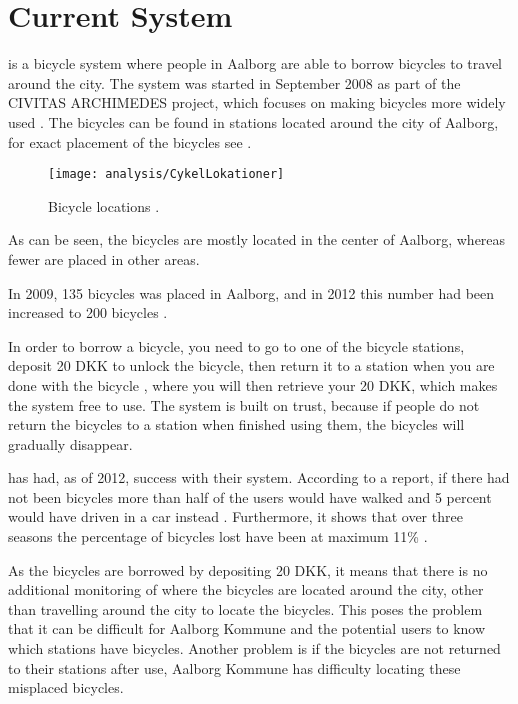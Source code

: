 \section{Current System}\label{sec:currentsystem}


\bycykel is a bicycle system where people in Aalborg are able to borrow bicycles to travel around the city.
The system was started in September 2008 as part of the CIVITAS ARCHIMEDES project, which focuses on making bicycles more widely used \citep{misc:aalborgcykling}.
The bicycles can be found in stations located around the city of Aalborg, for exact placement of the bicycles see .

\begin{figure}[h]
	\centering
	\texttt{[image: analysis/CykelLokationer]}
	\caption{Bicycle locations \citep{misc:aalborgbycykel}.}
	\label{fig:CykelLokationer}
\end{figure}

As can be seen, the bicycles are mostly located in the center of Aalborg, whereas fewer are placed in other areas.

In 2009, 135 bicycles was placed in Aalborg, and in 2012 this number had been increased to 200 bicycles \citep{misc:aalborgcykling}.

In order to borrow a bicycle, you need to go to one of the bicycle stations, deposit 20 DKK to unlock the bicycle, then return it to a station when you are done with the bicycle \citep{misc:aalborgbycykelregler}, where you will then retrieve your 20 DKK, which makes the system free to use.
The system is built on trust, because if people do not return the bicycles to a station when finished using them, the bicycles will gradually disappear.

\bycykel has had, as of 2012, success with their system. 
According to a report, if there had not been bicycles more than half of the users would have walked and 5 percent would have driven in a car instead \citep{misc:aalborgcykling}.
Furthermore, it shows that over three seasons the percentage of bicycles lost have been at maximum 11\% \citep{misc:aalborgcykling}.

As the bicycles are borrowed by depositing 20 DKK, it means that there is no additional monitoring of where the bicycles are located around the city, other than travelling around the city to locate the bicycles.
This poses the problem that it can be difficult for Aalborg Kommune and the potential users to know which stations have bicycles.
Another problem is if the bicycles are not returned to their stations after use, Aalborg Kommune has difficulty locating these misplaced bicycles.


